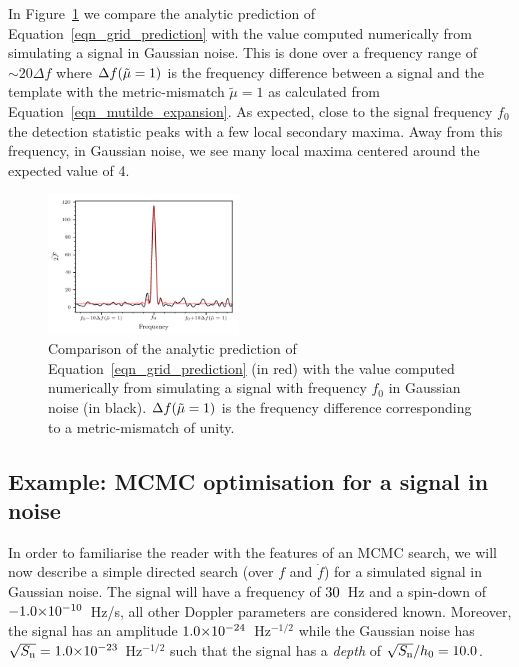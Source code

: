\documentclass[aps, prd, twocolumn, superscriptaddress, floatfix, showpacs, nofootinbib, longbibliography]{revtex4-1}
\begin{document}
In Figure~\ref{fig_grid_frequency} we compare the analytic prediction of
Equation~\eqref{eqn_grid_prediction} with the value computed numerically from
simulating a signal in Gaussian noise. This is done over a frequency range of
$\sim20\Delta f$ where $\Delta f(\tilde{\mu}=1)$ is the frequency difference between a signal
and the template with the metric-mismatch $\tilde{\mu}=1$ as calculated from
Equation~\eqref{eqn_mutilde_expansion}. As expected, close to the signal
frequency $f_0$ the detection statistic peaks with a few local secondary
maxima. Away from this frequency, in Gaussian noise, we see many local maxima
centered around the expected value of 4.
\begin{figure}[htb]
\centering \includegraphics[width=0.45\textwidth]{grided_frequency_search_1D}
\caption{Comparison of the analytic prediction of
Equation~\eqref{eqn_grid_prediction} (in red) with the value computed
numerically from simulating a signal with frequency $f_0$ in Gaussian noise (in
black). $\Delta f(\tilde{\mu}=1)$ is the frequency difference corresponding to a
metric-mismatch of unity.}
\label{fig_grid_frequency}
\end{figure}

\subsection{Example: MCMC optimisation for a signal in noise}

In order to familiarise the reader with the features of an MCMC search, we will
now describe a simple directed search (over $f$ and $\dot{f}$) for a simulated
signal in Gaussian noise. The signal will have a frequency of
$30$~Hz and a spin-down of $-1.0{\times}10^{-10}$~Hz/s, all other
Doppler parameters are considered known. Moreover, the signal has an amplitude
$1.0{\times}10^{-24}$~Hz$^{-1/2}$ while the Gaussian noise has
$\sqrt{S_{\rm n}}=1.0{\times}10^{-23}$~Hz$^{-1/2}$ such that the signal has a
\emph{depth} of $\sqrt{S_{\rm n}}/h_0 = 10.0$.
\end{document}
